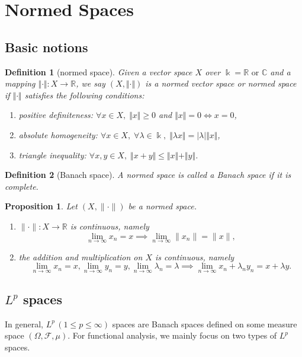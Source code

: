 \documentclass{report}
\newtheorem{definition}{Definition}[section]
\newtheorem{proposition}{Proposition}[section]
\theoremstyle{nonumberplain}
\begin{document}
\section{Normed Spaces}
\subsection{Basic notions}
\begin{definition}[normed space]
	Given a vector space $X$ over $\Bbbk=\mathbb{R}\text{ or }\mathbb{C}$ and a mapping $\Vert\cdot\Vert : X\to\mathbb{R}$, we say
	$\left(X, \Vert\cdot\Vert\right)$ is a \emph{normed vector space} or \emph{normed space} if $\Vert\cdot\Vert$ satisfies the following conditions:
	\begin{enumerate}
		\item positive definiteness: $\forall x\in X,\;\Vert x\Vert\ge 0$ and $\Vert x\Vert=0\iff x=0$,
		\item absolute homogeneity: $\forall x\in X,\;\forall\lambda\in\Bbbk,\;\Vert \lambda x\Vert=|\lambda| \Vert  x\Vert$,
		\item triangle inequality: $\forall x, y\in X,\;\Vert x+ y\Vert\le\Vert x\Vert+\Vert y\Vert$.
	\end{enumerate}	
\end{definition}

\begin{definition}[Banach space]
	A normed space is called a \emph{Banach space} if it is complete.
\end{definition}

\begin{proposition}
	Let $(X,\|\cdot\|)$ be a normed space.
	\begin{enumerate}
		\item $\|\cdot\|:X\to\mathbb{R}$ is continuous, namely
		\[\lim_{n\to\infty}x_n=x\implies\lim_{n\to\infty}\|x_n\|=\|x\|,\]
		\item the addition and multiplication on $X$ is continuous, namely
		\[
			\lim_{n\to\infty}x_n=x,\lim_{n\to\infty}y_n=y,\lim_{n\to\infty}\lambda_n=\lambda\implies\lim_{n\to\infty}x_n+\lambda_ny_n=x+\lambda y.
		\]
	\end{enumerate}	
\end{proposition}

\subsection{$L^p$ spaces}
In general, $L^p\,(1\le p\le\infty)$ spaces are Banach spaces defined on some measure space $(\Omega, \mathcal{F}, \mu)$. For functional analysis, we mainly focus on two types of $L^p$ spaces. 
\end{document}
